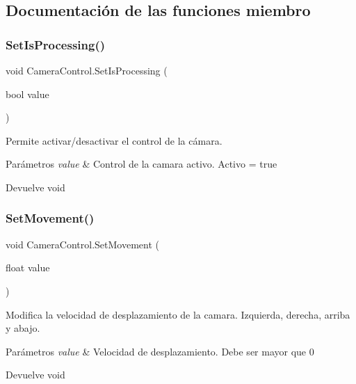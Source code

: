 \subsection{Documentación de las funciones miembro}
\mbox{\label{class_camera_control_a715690bfd42a136da5b5880debb2e420}} 
\subsubsection{\texorpdfstring{SetIsProcessing()}{SetIsProcessing()}}
{\footnotesize\ttfamily void Camera\+Control.\+Set\+Is\+Processing (\begin{DoxyParamCaption}\item[{bool}]{value }\end{DoxyParamCaption})\hspace{0.3cm}{\ttfamily [inline]}}

Permite activar/desactivar el control de la cámara. 
\begin{DoxyParams}{Parámetros}
{\em value} & Control de la camara activo. Activo = true \\
\hline
\end{DoxyParams}
\begin{DoxyReturn}{Devuelve}
void 
\end{DoxyReturn}
\mbox{\label{class_camera_control_a2307b3b28fd8f9f40248fc0441f916de}} 
\subsubsection{\texorpdfstring{SetMovement()}{SetMovement()}}
{\footnotesize\ttfamily void Camera\+Control.\+Set\+Movement (\begin{DoxyParamCaption}\item[{float}]{value }\end{DoxyParamCaption})\hspace{0.3cm}{\ttfamily [inline]}}

Modifica la velocidad de desplazamiento de la camara. Izquierda, derecha, arriba y abajo. 
\begin{DoxyParams}{Parámetros}
{\em value} & Velocidad de desplazamiento. Debe ser mayor que 0 \\
\hline
\end{DoxyParams}
\begin{DoxyReturn}{Devuelve}
void 
\end{DoxyReturn}
\mbox{\label{class_camera_control_ab3ac3df0eb5347d1f7eb356f4226a696}} 
